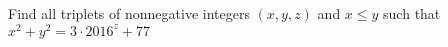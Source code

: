 Find all triplets of nonnegative integers $(x,y,z)$ and $x\leq y$ such that
$x^2+y^2=3 \cdot 2016^z+77$